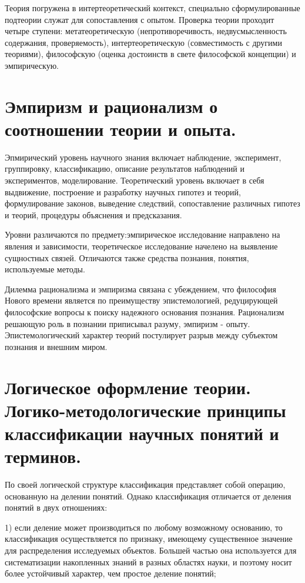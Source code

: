 \documentclass[12pt, specialist, subf, substylefile = spbu.rtx]{disser}
\begin{document}
Теория погружена в интертеоретический контекст, специально сформулированные подтеории служат для сопоставления с опытом. Проверка теории проходит четыре ступени: метатеоретическую (непротиворечивость, недвусмысленность содержания, проверяемость), интертеоретическую (совместимость с другими теориями), философскую (оценка достоинств в свете философской концепции) и эмпирическую. 

\section{Эмпиризм и рационализм о соотношении теории и опыта.}
Эпмирический уровень научного знания включает наблюдение, эксперимент, группировку, классификацию, описание результатов наблюдений и экспериментов, моделирование. Теоретический уровень включает в себя выдвижение, построение и разработку научных гипотез и теорий, формулирование законов, выведение следствий, сопоставление различных гипотез и теорий, процедуры объяснения и предсказания.

Уровни различаются по предмету:эмпирическое исследование направлено на явления и зависимости, теоретическое исследование начелено на выявление сущностных связей. Отличаются также средства познания, понятия, используемые методы.

Дилемма рационализма и эмпиризма связана с убеждением, что философия Нового времени является по преимуществу эпистемологией, редуцирующей философские вопросы к поиску надежного основания познания. Рационализм решающую роль в познании приписывал разуму, эмпиризм - опыту. Эпистемологический характер теорий постулирует разрыв между субъектом познания и внешним миром.

\section{Логическое оформление теории. Логико-методологические принципы классификации научных понятий и терминов.}
По своей логической структуре классификация представляет собой операцию, основанную на делении понятий. Однако классификация отличается от деления понятий в двух отношениях:

1) если деление может производиться по любому возможному основанию, то классификация осуществляется по признаку, имеющему существенное значение для распределения исследуемых объектов. Большей частью она используется для систематизации накопленных знаний в разных областях науки, и поэтому носит более устойчивый характер, чем простое деление понятий;
\end{document}
